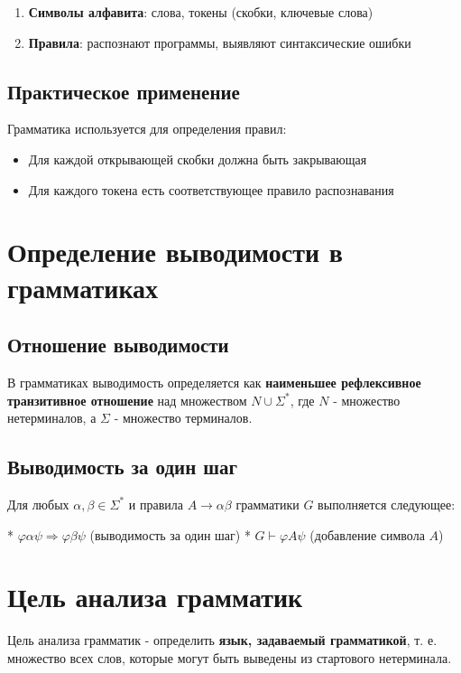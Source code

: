 \documentclass{article}
\begin{document}
\begin{itemize}
\begin{enumerate}
  \item \textbf{Символы алфавита}: слова, токены (скобки, ключевые слова)
  \item \textbf{Правила}: распознают программы, выявляют синтаксические ошибки
\end{enumerate}

\subsection{Практическое применение}

Грамматика используется для определения правил:

\begin{itemize}
  \item Для каждой открывающей скобки должна быть закрывающая
  \item Для каждого токена есть соответствующее правило распознавания
\end{itemize}
\section{Определение выводимости в грамматиках}

\subsection{Отношение выводимости}
В грамматиках выводимость определяется как \textbf{наименьшее рефлексивное транзитивное отношение} над множеством $N \cup \Sigma^*$, где $N$ - множество нетерминалов, а $\Sigma$ - множество терминалов.

\subsection{Выводимость за один шаг}
Для любых $\alpha, \beta \in \Sigma^*$ и правила $A \rightarrow \alpha \beta$ грамматики $G$ выполняется следующее:

* $\varphi \alpha \psi \Rightarrow \varphi \beta \psi$ (выводимость за один шаг)
* $G \vdash \varphi A \psi$ (добавление символа $A$)

\section{Цель анализа грамматик}

Цель анализа грамматик - определить \textbf{язык, задаваемый грамматикой}, т. е. множество всех слов, которые могут быть выведены из стартового нетерминала.


\end{itemize}
\end{document}
